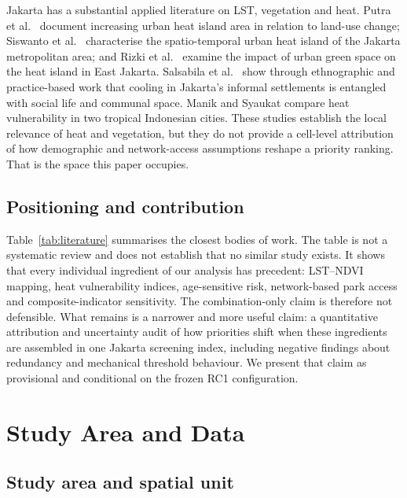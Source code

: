 \documentclass[times,twoside]{_Templates/MultiTargetManuscript}
\begin{document}
Jakarta has a substantial applied literature on LST, vegetation and heat. Putra
et al.\ \citep{putra2021} document increasing urban heat island area in relation
to land-use change; Siswanto et al.\ \citep{siswanto2023} characterise the
spatio-temporal urban heat island of the Jakarta metropolitan area; and Rizki et
al.\ \citep{rizki2024} examine the impact of urban green space on the heat island
in East Jakarta. Salsabila et al.\ \citep{salsabila2023} show through ethnographic
and practice-based work that cooling in Jakarta's informal settlements is
entangled with social life and communal space. Manik and Syaukat
\citep{manik2017} compare heat vulnerability in two tropical Indonesian cities.
These studies establish the local relevance of heat and vegetation, but they do
not provide a cell-level attribution of how demographic and network-access
assumptions reshape a priority ranking. That is the space this paper occupies.

\subsection{Positioning and contribution}

Table~\ref{tab:literature} summarises the closest bodies of work. The table is
not a systematic review and does not establish that no similar study exists. It
shows that every individual ingredient of our analysis has precedent: LST--NDVI
mapping, heat vulnerability indices, age-sensitive risk, network-based park
access and composite-indicator sensitivity. The combination-only claim is
therefore not defensible. What remains is a narrower and more useful claim: a
quantitative attribution and uncertainty audit of how priorities shift when
these ingredients are assembled in one Jakarta screening index, including
negative findings about redundancy and mechanical threshold behaviour. We
present that claim as provisional and conditional on the frozen RC1
configuration.



\section{Study Area and Data}

\subsection{Study area and spatial unit}
\end{document}
